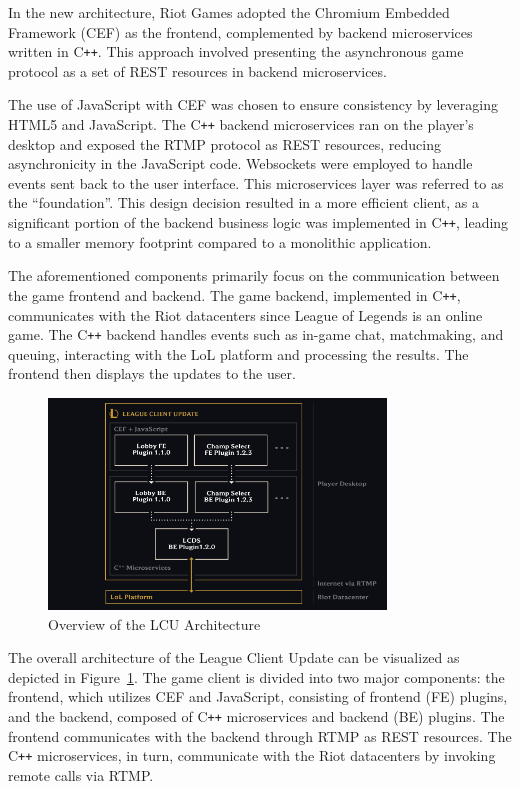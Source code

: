 \documentclass[11pt,a4paper,oneside]{report}
\begin{document}
In the new architecture, Riot Games adopted the Chromium Embedded Framework (CEF) as the frontend, complemented by backend microservices written in C\texttt{++}. This approach involved presenting the asynchronous game protocol as a set of REST resources in backend microservices.

The use of JavaScript with CEF was chosen to ensure consistency by leveraging HTML5 and JavaScript. The C\texttt{++} backend microservices ran on the player's desktop and exposed the RTMP protocol as REST resources, reducing asynchronicity in the JavaScript code. Websockets were employed to handle events sent back to the user interface. This microservices layer was referred to as the ``foundation''. This design decision resulted in a more efficient client, as a significant portion of the backend business logic was implemented in C\texttt{++}, leading to a smaller memory footprint compared to a monolithic application.

The aforementioned components primarily focus on the communication between the game frontend and backend. The game backend, implemented in C\texttt{++}, communicates with the Riot datacenters since League of Legends is an online game. The C\texttt{++} backend handles events such as in-game chat, matchmaking, and queuing, interacting with the LoL platform and processing the results. The frontend then displays the updates to the user.

\begin{figure}[H]
  \centering
  \includegraphics[width=0.8\textwidth]{assets/lcu_architecture.png}
  \caption{Overview of the LCU Architecture \cite{mc-veigh-2016}}
  \label{fig:lcu_architecture}
\end{figure}

The overall architecture of the League Client Update can be visualized as depicted in Figure~\ref{fig:lcu_architecture}. The game client is divided into two major components: the frontend, which utilizes CEF and JavaScript, consisting of frontend (FE) plugins, and the backend, composed of C\texttt{++} microservices and backend (BE) plugins. The frontend communicates with the backend through RTMP as REST resources. The C\texttt{++} microservices, in turn, communicate with the Riot datacenters by invoking remote calls via RTMP.
\end{document}
